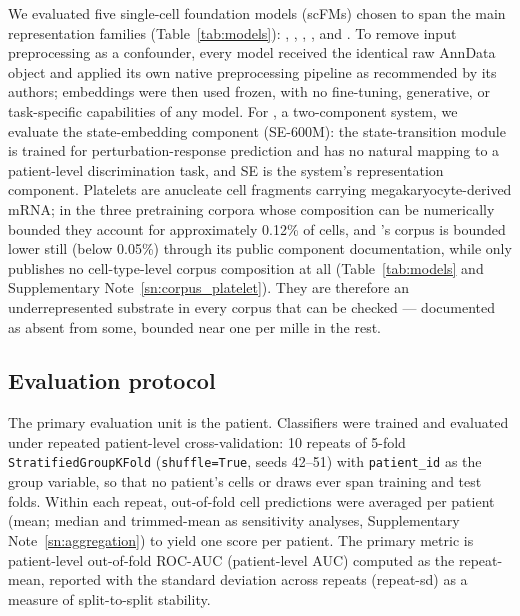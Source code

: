 We evaluated five single-cell foundation models (scFMs) chosen to span the
main representation families (Table~\ref{tab:models}): ,
, , , and . To
remove input preprocessing as a confounder, every model received the identical
raw AnnData object and applied its own native preprocessing pipeline as
recommended by its authors; embeddings were then used frozen, with no
fine-tuning, generative, or task-specific capabilities of any model. For
, a two-component system, we evaluate the state-embedding
component (SE-600M): the state-transition module is trained for
perturbation-response prediction and has no natural mapping to a
patient-level discrimination task, and SE is the system's representation
component. Platelets are anucleate cell fragments carrying
megakaryocyte-derived mRNA; in the three pretraining corpora whose
composition can be numerically bounded they account for approximately
0.12\% of cells, and 's corpus is bounded lower still (below
0.05\%) through its public component documentation, while only
 publishes no cell-type-level corpus composition at all
(Table~\ref{tab:models} and Supplementary Note~\ref{sn:corpus_platelet}).
They are therefore an underrepresented substrate in every corpus that can
be checked --- documented as absent from some, bounded near one per mille
in the rest.

\subsection{Evaluation protocol}
\label{ssec:methods_cv}

The primary evaluation unit is the patient. Classifiers were trained and
evaluated under repeated patient-level cross-validation: 10 repeats of 5-fold
\texttt{StratifiedGroupKFold} (\texttt{shuffle=True}, seeds 42--51) with
\texttt{patient\_id} as the group variable, so that no patient's cells or
draws ever span training and test folds. Within each repeat, out-of-fold cell
predictions were averaged per patient (mean; median and trimmed-mean as
sensitivity analyses, Supplementary Note~\ref{sn:aggregation}) to yield one
score per patient. The primary metric is patient-level out-of-fold ROC-AUC
(patient-level AUC) computed as the repeat-mean, reported with the standard
deviation across repeats (repeat-sd) as a measure of split-to-split stability.

